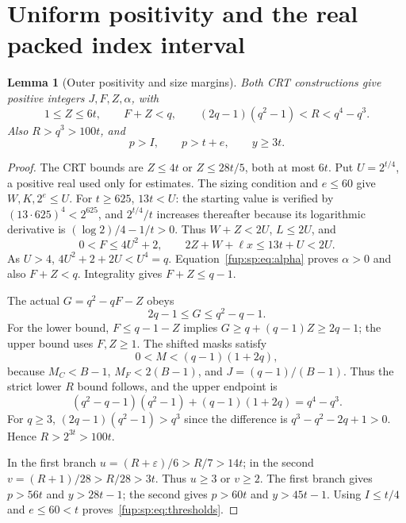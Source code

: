 \documentclass[11pt,letterpaper]{article}
\newtheorem{lemma}[theorem]{Lemma}
\theoremstyle{definition}\newtheorem{definition}[theorem]{Definition}
\theoremstyle{remark}\newtheorem{remark}[theorem]{Remark}
\begin{document}
\section{Uniform positivity and the real packed index interval}
\label{fup:sp:sec:bounds}
\begin{lemma}[Outer positivity and size margins]
\label{fup:sp:lem:bounds}
Both CRT constructions give positive integers $J,F,Z,\alpha$, with
\begin{equation}
1\le Z\le6t,\qquad F+Z<q,\qquad
(2q-1)(q^2-1)<R<q^4-q^3.
\label{fup:sp:eq:outerbounds}
\end{equation}
Also $R>q^3>100t$, and
\begin{equation}
p>I,\qquad p>t+e,\qquad y\ge3t.
\label{fup:sp:eq:thresholds}
\end{equation}
\end{lemma}
\begin{proof}
The CRT bounds are $Z\le4t$ or $Z\le28t/5$, both at most $6t$.
Put $U=2^{t/4}$, a positive real used only for estimates.
The sizing condition and $e\le60$ give $W,K,2^e\le U$.
For $t\ge625$, $13t<U$: the starting value is verified by
$(13\cdot625)^4<2^{625}$, and $2^{t/4}/t$ increases thereafter
because its logarithmic derivative is $(\log2)/4-1/t>0$.
Thus $W+Z<2U$, $L\le2U$, and
\[
0<F\le4U^2+2,\qquad
2Z+W+\ell x\le13t+U<2U.
\]
As $U>4$, $4U^2+2+2U<U^4=q$. Equation~\eqref{fup:sp:eq:alpha} proves
$\alpha>0$ and also $F+Z<q$. Integrality gives $F+Z\le q-1$.

The actual $G=q^2-qF-Z$ obeys
\begin{equation}
2q-1\le G\le q^2-q-1.
\label{fup:sp:eq:Gbounds}
\end{equation}
For the lower bound, $F\le q-1-Z$ implies
$G\ge q+(q-1)Z\ge2q-1$; the upper bound uses $F,Z\ge1$.
The shifted masks satisfy
\begin{equation}
0<M<(q-1)(1+2q),
\label{fup:sp:eq:Mbounds}
\end{equation}
because $M_C<B-1$, $M_F<2(B-1)$, and $J=(q-1)/(B-1)$.
Thus the strict lower $R$ bound follows, and the upper endpoint is
\[
(q^2-q-1)(q^2-1)+(q-1)(1+2q)=q^4-q^3.
\]
For $q\ge3$, $(2q-1)(q^2-1)>q^3$ since the difference is
$q^3-q^2-2q+1>0$. Hence $R>2^{3t}>100t$.

In the first branch $u=(R+\varepsilon)/6>R/7>14t$;
in the second $v=(R+1)/28>R/28>3t$.
Thus $u\ge3$ or $v\ge2$. The first branch gives $p>56t$
and $y>28t-1$; the second gives $p>60t$ and $y>45t-1$.
Using $I\le t/4$ and $e\le60<t$ proves~\eqref{fup:sp:eq:thresholds}.
\end{proof}
\end{document}
